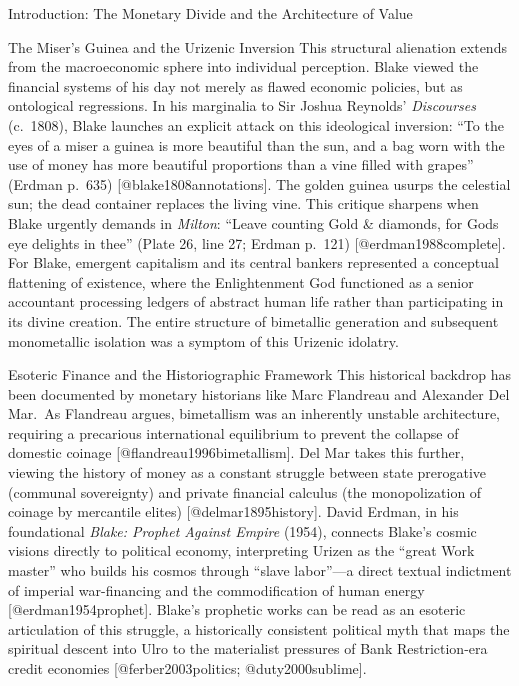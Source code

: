 \documentclass[
  ignorenonframetext,
]{beamer}
\begin{document}
\begin{frame}{Introduction: The Monetary Divide and the Architecture of
Value}
\begin{block}{The Miser's Guinea and the Urizenic Inversion}
\protect{}\label{the-misers-guinea-and-the-urizenic-inversion}
This structural alienation extends from the macroeconomic sphere into
individual perception. Blake viewed the financial systems of his day not
merely as flawed economic policies, but as ontological regressions. In
his marginalia to Sir Joshua Reynolds' \emph{Discourses} (c.~1808),
Blake launches an explicit attack on this ideological inversion: ``To
the eyes of a miser a guinea is more beautiful than the sun, and a bag
worn with the use of money has more beautiful proportions than a vine
filled with grapes'' (Erdman p.~635) {[}@blake1808annotations{]}. The
golden guinea usurps the celestial sun; the dead container replaces the
living vine. This critique sharpens when Blake urgently demands in
\emph{Milton}: ``Leave counting Gold \& diamonds, for Gods eye delights
in thee'' (Plate 26, line 27; Erdman p.~121) {[}@erdman1988complete{]}.
For Blake, emergent capitalism and its central bankers represented a
conceptual flattening of existence, where the Enlightenment God
functioned as a senior accountant processing ledgers of abstract human
life rather than participating in its divine creation. The entire
structure of bimetallic generation and subsequent monometallic isolation
was a symptom of this Urizenic idolatry.
\end{block}

\begin{block}{Esoteric Finance and the Historiographic Framework}
\protect{}\label{esoteric-finance-and-the-historiographic-framework}
This historical backdrop has been documented by monetary historians like
Marc Flandreau and Alexander Del Mar.~As Flandreau argues, bimetallism
was an inherently unstable architecture, requiring a precarious
international equilibrium to prevent the collapse of domestic coinage
{[}@flandreau1996bimetallism{]}. Del Mar takes this further, viewing the
history of money as a constant struggle between state prerogative
(communal sovereignty) and private financial calculus (the
monopolization of coinage by mercantile elites)
{[}@delmar1895history{]}. David Erdman, in his foundational \emph{Blake:
Prophet Against Empire} (1954), connects Blake's cosmic visions directly
to political economy, interpreting Urizen as the ``great Work master''
who builds his cosmos through ``slave labor''---a direct textual
indictment of imperial war-financing and the commodification of human
energy {[}@erdman1954prophet{]}. Blake's prophetic works can be read as
an esoteric articulation of this struggle, a historically consistent
political myth that maps the spiritual descent into Ulro to the
materialist pressures of Bank Restriction-era credit economies
{[}@ferber2003politics; @duty2000sublime{]}.
\end{block}


\end{frame}
\end{document}
